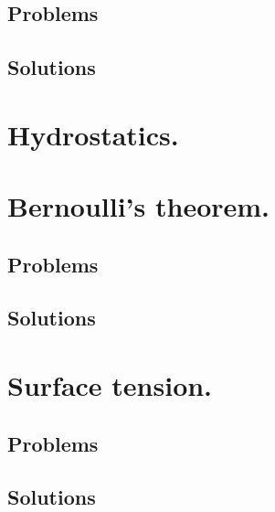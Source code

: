       \section{Problems}
         
         
         
         
         
         
         
         
      \section{Solutions}
         \shipoutAnswer

   \chapter{Hydrostatics.}

   \chapter{Bernoulli's theorem.}
      
      \section{Problems}
         
         
      \section{Solutions}
         \shipoutAnswer

   \chapter{Surface tension.}
      \section{Problems}
         
      \section{Solutions}
         \shipoutAnswer


